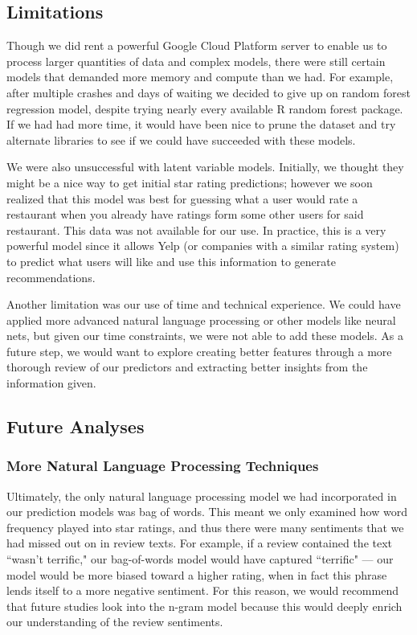 \documentclass[10pt]{article}
\begin{document}
\subsection{Limitations}
\label{sixpointone}
Though we did rent a powerful Google Cloud Platform server to enable us to process larger quantities of data and complex models, there were still certain models that demanded more memory and compute than we had. For example, after multiple crashes and days of waiting we decided to give up on random forest regression model, despite trying nearly every available R random forest package. If we had had more time, it would have been nice to prune the dataset and try alternate libraries to see if we could have succeeded with these models. 
\vspace{0.1in}

\noindent
We were also unsuccessful with latent variable models. Initially, we thought they might be a nice way to get initial star rating predictions; however we soon realized that this model was best for guessing what a user would rate a restaurant when you already have ratings form some other users for said restaurant. This data was not available for our use. In practice, this is a very powerful model since it allows Yelp (or companies with a similar rating system) to predict what users will like and use this information to generate recommendations.
\vspace{0.1in}

\noindent
Another limitation was our use of time and technical experience. We could have applied more advanced natural language processing or other models like neural nets, but given our time constraints, we were not able to add these models. As a future step, we would want to explore creating better features through a more thorough review of our predictors and extracting better insights from the information given.  

\subsection{Future Analyses}
\subsubsection{More Natural Language Processing Techniques}
Ultimately, the only natural language processing model we had incorporated in our prediction models was bag of words. This meant we only examined how word frequency played into star ratings, and thus there were many sentiments that we had missed out on in review texts. For example, if a review contained the text ``wasn't terrific," our bag-of-words model would have captured ``terrific" --- our model would be more biased toward a higher rating, when in fact this phrase lends itself to a more negative sentiment. For this reason, we would recommend that future studies look into the n-gram model because this would deeply enrich our understanding of the review sentiments.
\end{document}
